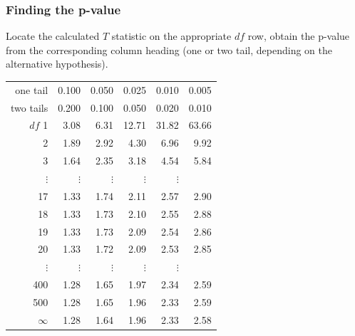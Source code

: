 
\begin{frame}
\frametitle{Finding the p-value}

Locate the calculated $T$ statistic on the appropriate $df$ row, obtain the p-value from the corresponding column heading (one or two tail, depending on the alternative hypothesis).

{\scriptsize
\begin{center}
\begin{tabular}{r | rrr rr}
one tail & \hspace{1.5mm}  0.100 & \hspace{1.5mm} 0.050 & \hspace{1.5mm} 0.025 & \hspace{1.5mm} 0.010 & \hspace{1.5mm} 0.005  \\
two tails & 0.200 & 0.100 & 0.050 & 0.020 & 0.010 \\
\hline
{$df$} \hfill 1  &  {  3.08} & {  6.31} & { 12.71} & { 31.82} & { 63.66}  \\ 
2  &  {  1.89} & {  2.92} & {  4.30} & {  6.96} & {  9.92}  \\ 
3  &  {  1.64} & {  2.35} & {  3.18} & {  4.54} & {  5.84}  \\ 
$\vdots$ & $\vdots$ &$\vdots$ &$\vdots$ &$\vdots$ & \\
17  &  {  1.33} & {  1.74} & {  2.11} & {  2.57} & {  2.90}  \\ 
18  &  {  1.33} & {  1.73} & {  2.10} & {  2.55} & {  2.88}  \\ 
19  &  {  1.33} & {  1.73} & {  2.09} & {  2.54} & {  2.86}  \\ 
20  &  {  1.33} & {  1.72} & {  2.09} & {  2.53} & {  2.85}  \\ 
$\vdots$ & $\vdots$ &$\vdots$ &$\vdots$ &$\vdots$ & \\
400  &  {  1.28} & {  1.65} & {  1.97} & {  2.34} & {  2.59}  \\ 
500  &  {  1.28} & {  1.65} & {  1.96} & {  2.33} & {  2.59}  \\ 
$\infty$  &  {  1.28} & {  1.64} & {  1.96} & {  2.33} & {  2.58}  \\ 
\end{tabular}
\end{center}
}

\end{frame}


